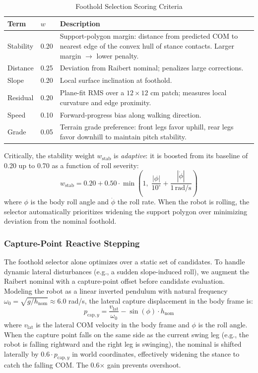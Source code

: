 \documentclass[letterpaper, 10 pt, conference]{ieeeconf}  %
\begin{document}
\begin{table}[ht]
\centering
\caption{Foothold Selection Scoring Criteria}
\label{tab:foothold_weights}
\begin{tabular}{|p{1.1cm}|p{0.55cm}|p{5.4cm}|}
\hline
\textbf{Term} & \textbf{$w$} & \textbf{Description} \\
\hline
Stability & 0.20 & Support-polygon margin: distance from predicted COM to nearest edge of the convex hull of stance contacts. Larger margin $\to$ lower penalty. \\
Distance & 0.25 & Deviation from Raibert nominal; penalizes large corrections. \\
Slope & 0.20 & Local surface inclination at foothold. \\
Residual & 0.20 & Plane-fit RMS over a $12\times12$ cm patch; measures local curvature and edge proximity. \\
Speed & 0.10 & Forward-progress bias along walking direction. \\
Grade & 0.05 & Terrain grade preference: front legs favor uphill, rear legs favor downhill to maintain pitch stability. \\
\hline
\end{tabular}
\end{table}

Critically, the stability weight $w_{\text{stab}}$ is \textit{adaptive}: it is boosted from its baseline of 0.20 up to 0.70 as a function of roll severity:
\begin{equation}
w_{\text{stab}} = 0.20 + 0.50 \cdot \min\!\left(1,\; \frac{|\phi|}{10^\circ} + \frac{|\dot{\phi}|}{1\,\text{rad/s}}\right) \label{eq:adaptive_stab}
\end{equation}
where $\phi$ is the body roll angle and $\dot{\phi}$ the roll rate. When the robot is rolling, the selector automatically prioritizes widening the support polygon over minimizing deviation from the nominal foothold.

\subsubsection{Capture-Point Reactive Stepping}
\label{sec:capture_point}
The foothold selector alone optimizes over a static set of candidates. To handle dynamic lateral disturbances (e.g., a sudden slope-induced roll), we augment the Raibert nominal with a capture-point offset before candidate evaluation. Modeling the robot as a linear inverted pendulum with natural frequency $\omega_0 = \sqrt{g/h_{\text{nom}}} \approx 6.0$ rad/s, the lateral capture displacement in the body frame is:
\begin{equation}
p_{\text{cap},y} = \frac{v_{\text{lat}}}{\omega_0} - \sin(\phi) \cdot h_{\text{nom}} \label{eq:capture_point}
\end{equation}
where $v_{\text{lat}}$ is the lateral COM velocity in the body frame and $\phi$ is the roll angle. When the capture point falls on the same side as the current swing leg (e.g., the robot is falling rightward and the right leg is swinging), the nominal is shifted laterally by $0.6 \cdot p_{\text{cap},y}$ in world coordinates, effectively widening the stance to catch the falling COM. The 0.6$\times$ gain prevents overshoot.
\end{document}
